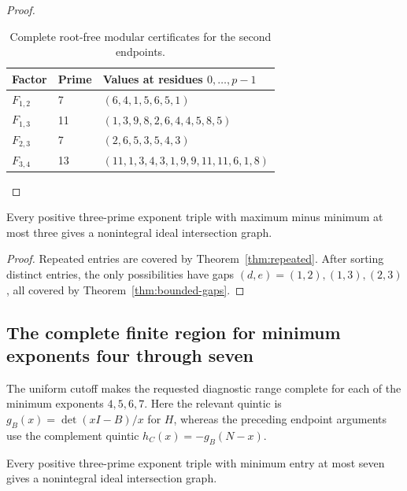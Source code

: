 \begin{proof}
\begin{table}[ht]
\centering
\begin{tabular}{lll}
\toprule
Factor&Prime&Values at residues $0,\ldots,p-1$\\
\midrule
$F_{1,2}$&7&$(6,4,1,5,6,5,1)$\\
$F_{1,3}$&11&$(1,3,9,8,2,6,4,4,5,8,5)$\\
$F_{2,3}$&7&$(2,6,5,3,5,4,3)$\\
$F_{3,4}$&13&$(11,1,3,4,3,1,9,9,11,11,6,1,8)$\\
\bottomrule
\end{tabular}
\caption{Complete root-free modular certificates for the second endpoints.}
\label{tab:gap-modular}
\end{table}
\end{proof}

\begin{corollary}
\label{cor:span-three}
Every positive three-prime exponent triple with maximum minus minimum
at most three gives a nonintegral ideal intersection graph.
\end{corollary}

\begin{proof}
Repeated entries are covered by Theorem~\ref{thm:repeated}. After
sorting distinct entries, the only possibilities have gaps
$(d,e)=(1,2),(1,3),(2,3)$, all covered by
Theorem~\ref{thm:bounded-gaps}.
\end{proof}

\subsection{The complete finite region for minimum exponents four through seven}

The uniform cutoff makes the requested diagnostic range complete for each
of the minimum exponents $4,5,6,7$. Here the relevant quintic is
$g_B(x)=\det(xI-B)/x$ for $H$, whereas the preceding endpoint arguments
use the complement quintic $h_C(x)=-g_B(N-x)$.

\begin{corollary}
\label{cor:minimum-seven}
Every positive three-prime exponent triple with minimum entry at most
seven gives a nonintegral ideal intersection graph.
\end{corollary}

